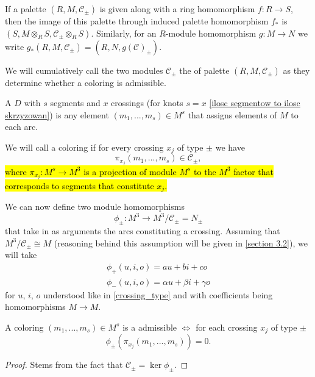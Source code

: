 If a palette $(R, M, \mathcal{C}_\pm)$ is given along with a ring homomorphism $f:R\to S$, then the image of this palette through induced palette homomorphism $f_*$ is $(S, M\otimes_R S, \mathcal{C}_\pm\otimes_R S)$. Similarly, for an $R$-module homomorphism $g:M\to N$ we write $g_*(R, M, \mathcal{C}_\pm)=(R, N, g(\mathcal{C})_\pm)$. 

We will cumulatively call the two modules $\mathcal{C}_\pm$ the  of palette $(R, M, \mathcal{C}_\pm)$ as they determine whether a coloring is admissible.

\begin{definition}
  A  $D$ with $s$ segments and $x$ crossings (for knots $s=x$ \cref{ilosc segmentow to ilosc skrzyzowan}) is any element $(m_1,..., m_s)\in M^s$ that assigns elements of $M$ to each arc. 

  We will call a coloring  if for every crossing $x_j$ of type $\pm$ we have 
  $$\pi_{x_j}(m_1,..., m_s)\in \mathcal{C}_\pm,$$
\hl{where $\pi_{x_j}:M^s\to M^3$ is a projection of module $M^s$ to the $M^3$ factor that corresponds to segments that constitute $x_j$.} 
\end{definition}



We can now define two module homomorphisms
$$\phi_\pm:M^3\to M^3/\mathcal{C}_\pm=N_\pm$$
that take in as arguments the arcs constituting a crossing. Assuming that $M^3/\mathcal{C}_\pm\cong M$ (reasoning behind this assumption will be given in \cref{section 3.2}), we will take 
\begin{align}
  \phi_+(u,i,o)=au+bi+co \label{phi equations1} \\ 
  \phi_-(u,i,o)=\alpha u+\beta i+\gamma o \label{phi equations2}
\end{align}
for $u$, $i$, $o$ understood like in \cref{crossing_type} and with coefficients being homomorphisms $M\to M$.

\begin{lemma}\label{proposition male kernel kolorowania}
  A coloring $(m_1,..., m_s)\in M^s$ is a admissible $\iff$ for each crossing $x_j$ of type $\pm$ 
  $$\phi_\pm(\pi_{x_j}(m_1,...,m_s))=0.$$
\end{lemma}

\begin{proof}
  Stems from the fact that $\mathcal{C}_\pm=\ker\phi_\pm$.
\end{proof}



